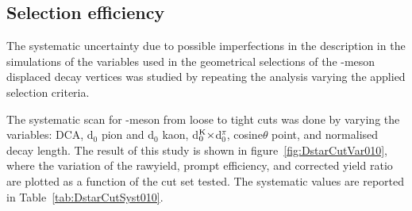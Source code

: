 \clearpage
\subsection{Selection efficiency}
\label{sec:eff_syst}
The systematic uncertainty due to possible imperfections in the description in the simulations of the
variables used in the geometrical selections of the \Dstar -meson displaced decay vertices was studied by
repeating the analysis varying the applied selection criteria.



The systematic scan for \Dstar -meson from loose to tight cuts was done by varying the variables: DCA, d$_0$ pion and d$_0$ kaon, d$^{\rm K}_0 \times$d$^{\pi}_0$, cosine$\theta$ point, and normalised decay length. The result of this study is shown in figure~\ref{fig:DstarCutVar010}, where the variation of the rawyield, prompt efficiency, and corrected yield ratio are plotted as a function of the cut set tested. The systematic values are reported in Table~\ref{tab:DstarCutSyst010}.

